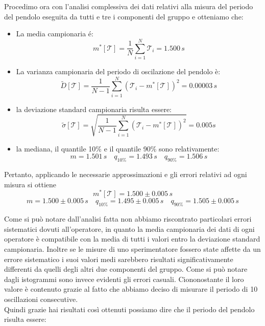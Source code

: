 Procedimo ora con l'analisi complessiva dei dati relativi alla misura del
periodo del pendolo eseguita da tutti e tre i componenti del gruppo e otteniamo che:

\begin{itemize}
    \item{La media campionaria é:}
        \begin{equation}
            m^*[\mathcal{T}] = \frac{1}{N} \sum_{i=1}^{N} \mathcal{T}_i = 1.500\,s
        \end{equation} 

    \item{La varianza campionaria del periodo di oscilazione del pendolo è:}
        \begin{equation}
            \tilde{D}[\mathcal{T}] = \frac{1}{N - 1} \sum_{i=1}^{N} (\mathcal{T}_i - m^*[\mathcal{T}])^2 = 0.00003\,s
        \end{equation}

    \item{la deviazione standard campionaria risulta essere:}
        \begin{equation}
            \tilde{\sigma}[\mathcal{T}] = \sqrt{\frac{1}{N - 1} \sum_{i=1}^{N} (\mathcal{T}_i - m^*[\mathcal{T}])^2} = 0.005 s
        \end{equation}

    \item{la mediana, il quantile 10\% e il quantile 90\% sono relativamente:}
        \begin{equation*}
            m = 1.501\,s \quad
            q_{10\%} = 1.493\,s \quad
            q_{90\%} = 1.506\,s
        \end{equation*}
\end{itemize}

Pertanto, applicando le necessarie approssimazioni e gli errori relativi ad ogni misura si ottiene
\begin{equation*}
m^*[\mathcal{T}] = 1.500 \pm 0.005\,s
\end{equation*}
\begin{equation*}
m = 1.500 \pm 0.005\,s  \quad
q_{10\%} = 1.495 \pm 0.005\,s \quad
q_{90\%} = 1.505 \pm 0.005\,s
\end{equation*}

Come si può notare dall'analisi fatta non abbiamo riscontrato particolari errori sistematici dovuti all'operatore, in quanto la media campionaria dei dati di ogni operatore è compatibile con la media di tutti i valori entro la deviazione standard campionaria. Inoltre se le misure di uno sperimentatore fossero state affette da un errore sistematico i suoi valori medi sarebbero risultati significativamente differenti da quelli degli altri due componenti del gruppo.
Come si può notare dagli istogrammi sono invece evidenti gli errori casuali. Ciononostante il loro valore è contenuto grazie al fatto che abbiamo deciso di misurare il periodo di 10 oscillazioni consecutive.\\
Quindi grazie hai risultati così ottenuti possiamo dire che il periodo del pendolo risulta essere:

